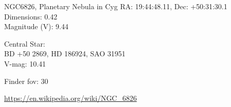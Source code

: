 \begin{block}{NGC6826, Planetary Nebula in Cyg}
    RA: 19:44:48.11, Dec: +50:31:30.1 \\ 
    Dimensions: 0.42 \\ 
    Magnitude (V): 9.44


    Central Star: \\ 
      \hspace{1em}BD +50 2869, HD 186924, SAO 31951 \\ 
      \hspace{1em}V-mag: 10.41 


    Finder fov: 30 

    \url{https://en.wikipedia.org/wiki/NGC_6826} 
\end{block}